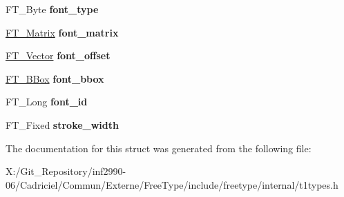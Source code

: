 \begin{DoxyCompactItemize}
\item 
\hypertarget{struct_t1___font_rec___a9d37e54d3a584f823dca80eca624f700}{F\-T\-\_\-\-Byte {\bfseries font\-\_\-type}}\label{struct_t1___font_rec___a9d37e54d3a584f823dca80eca624f700}

\item 
\hypertarget{struct_t1___font_rec___a87c95f084851d2bb9e48889e9444b2a8}{\hyperlink{struct_f_t___matrix__}{F\-T\-\_\-\-Matrix} {\bfseries font\-\_\-matrix}}\label{struct_t1___font_rec___a87c95f084851d2bb9e48889e9444b2a8}

\item 
\hypertarget{struct_t1___font_rec___ab6e773e20df1c585dc14ee3fa7ed1737}{\hyperlink{struct_f_t___vector__}{F\-T\-\_\-\-Vector} {\bfseries font\-\_\-offset}}\label{struct_t1___font_rec___ab6e773e20df1c585dc14ee3fa7ed1737}

\item 
\hypertarget{struct_t1___font_rec___a86fd1af4c03e34b7d151054ccc7525a7}{\hyperlink{struct_f_t___b_box__}{F\-T\-\_\-\-B\-Box} {\bfseries font\-\_\-bbox}}\label{struct_t1___font_rec___a86fd1af4c03e34b7d151054ccc7525a7}

\item 
\hypertarget{struct_t1___font_rec___a14178cf438d1a5fcb31b7d398d06cfaf}{F\-T\-\_\-\-Long {\bfseries font\-\_\-id}}\label{struct_t1___font_rec___a14178cf438d1a5fcb31b7d398d06cfaf}

\item 
\hypertarget{struct_t1___font_rec___ac71ace1872be6b2adbd3d6f5ca456d23}{F\-T\-\_\-\-Fixed {\bfseries stroke\-\_\-width}}\label{struct_t1___font_rec___ac71ace1872be6b2adbd3d6f5ca456d23}

\end{DoxyCompactItemize}


The documentation for this struct was generated from the following file\-:\begin{DoxyCompactItemize}
\item 
X\-:/\-Git\-\_\-\-Repository/inf2990-\/06/\-Cadriciel/\-Commun/\-Externe/\-Free\-Type/include/freetype/internal/t1types.\-h\end{DoxyCompactItemize}
